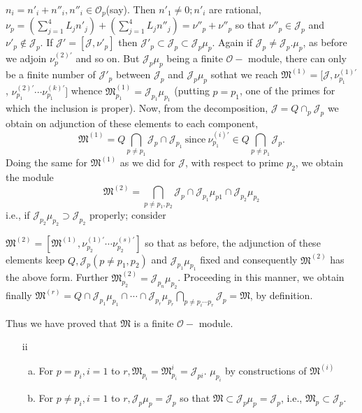$n_i = n'_i + n''_i,  n''_i \in \mathscr{O}_p$(say). Then $n'_1 \neq 0;
n'_i$ are rational, $\nu_p = \left(\sum \limits^4_{j=1} L_j
n'_j\right) +\left(\sum 
\limits^4_{j=1} L_j n''_j \right) = \nu''_p + \nu''_p$ so that $\nu''_p \in
\mathcal{J}_p$ and $\nu'_p \notin \mathcal{J}_p$. If
$\mathcal{J}' = [\mathcal{J}, \nu'_p]$ then $\mathcal{J}'_p \subset
\mathcal{J}_p \subset \mathcal{J}_p \mu_p$. Again if $\mathcal{J}_p
\neq \mathcal{J}_p. \mu_p$, as before we adjoin $\nu^{(2)'}_p$ and so
on. But $\mathcal{J}_p \mu_p$ being a finite $\mathscr{O}-$ module,
there can only be a finite number of $\mathcal{J}'_p$ between
$\mathcal{J}_p$ and $\mathcal{J}_p \mu_p$ so\pageoriginale that we reach
$\mathfrak{M}^{(1)} = [\mathcal{J},  \nu^{(1)'}_{p_1}$,
  $\nu^{(2)'}_{p_1} \cdots \nu^{(k)'}_{p_1}]$ whence
$\mathfrak{M}^{(1)}_{p_1} = \mathcal{J}_{p_1} \mu_{p_1}$ (putting $p
=p_1$, one of the primes for which the inclusion is proper). Now, from
the decomposition, $\mathcal{J} = Q \cap_p \mathcal{J}_p$ we obtain on
adjunction of these elements to each component, 
$$
\mathfrak{M}^{(1)} = Q \bigcap_{p \neq p_1} \mathcal{J}_p \cap
\mathcal{J}_{p_1} ~\text{since}~ \nu^{(i)'}_{p_1} \in Q \bigcap_{p \neq p_1}
\mathcal{J}_p. 
$$
Doing the same for $\mathfrak{M}^{(1)}$ as we did for $\mathcal{J}$,
with respect to prime $p_2$, we obtain the module 
$$
\mathfrak{M}^{(2)} = \bigcap_{p \neq p_1, p_2} \mathcal{J}_p \cap
\mathcal{J}_{p_1} \mu_{p1} \cap \mathcal{J}_{p_2} \mu_{p_2} 
$$
i.e., if $\mathcal{J}_{p_2} \mu_{p_2} \supset \mathcal{J}_{p_2}$
properly; consider 

$\mathfrak{M}^{(2)} = [\mathfrak{M}^{(1)}, \nu^{(1)'}_{p_2} \cdots
\nu^{(s)'}_{p_2}]$ so that as before, the adjunction of these
elements keep $Q,  \mathcal{J}_p (p \neq p_1, p_2)$ and
$\mathcal{J}_{p_1} \mu_{p_1}$ fixed and consequently
$\mathfrak{M}^{(2)}$ has the above form. Further
$\mathfrak{M}^{(2)}_{p_2} = \mathcal{J}_{p_n} \mu_{p_2}$. Proceeding
in this manner, we obtain finally $\mathfrak{M}^{(r)} = Q \cap
\mathcal{J}_{p_1} \mu_{p_1} \cap \cdots \cap \mathcal{J}_{p_r}
\mu_{p_r} \bigcap \limits_{p \neq p_i \cdots p_r} \mathcal{J}_p =
\mathfrak{M}$, by definition. 

Thus we have proved that $\mathfrak{M}$ is a finite $\mathscr{O}-$ module.

\begin{enumerate}
\item[ii]
  \begin{enumerate} [(a)]
  \item  For $p = p_i,  i=1 $ to $r, \mathfrak{M}_{p_i}=
    \mathfrak{M}^i_{p_i} = \mathcal{J}_{pi}$. $\mu_{p_i}$ by
    constructions of $\mathfrak{M}^{(i)}$  
  \item For $p \neq p_i, i = 1$ to $r, \mathcal{J}_{p} \mu_{p} =
    \mathcal{J}_{p}$ so that $\mathfrak{M} \subset \mathcal{J}_{p}
    \mu_p = \mathcal{J}_{p}$, i.e., $\mathfrak{M}_p \subset
    \mathcal{J}_{p}$. 
  \end{enumerate}
\end{enumerate}


